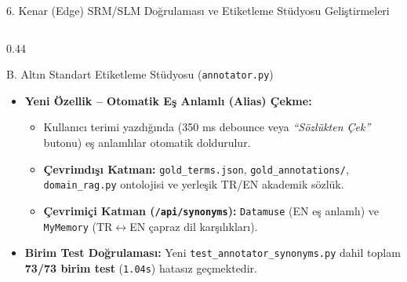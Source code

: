\documentclass[aspectratio=169,10pt]{beamer}
\begin{document}
\begin{frame}{6. Kenar (Edge) SRM/SLM Doğrulaması ve Etiketleme Stüdyosu Geliştirmeleri}
\begin{columns}[T]
\begin{column}{0.44\textwidth}
\begin{block}{B. Altın Standart Etiketleme Stüdyosu (\texttt{annotator.py})}
\begin{itemize}
    \item \textbf{Yeni Özellik -- Otomatik Eş Anlamlı (Alias) Çekme:}
    \begin{itemize}
        \item Kullanıcı terimi yazdığında (350 ms debounce veya \textit{``Sözlükten Çek''} butonu) eş anlamlılar otomatik doldurulur.
        \item \textbf{Çevrimdışı Katman:} \texttt{gold\_terms.json}, \texttt{gold\_annotations/}, \texttt{domain\_rag.py} ontolojisi ve yerleşik TR/EN akademik sözlük.
        \item \textbf{Çevrimiçi Katman (\texttt{/api/synonyms}):} \texttt{Datamuse} (EN eş anlamlı) ve \texttt{MyMemory} (TR$\leftrightarrow$EN çapraz dil karşılıkları).
    \end{itemize}
    \item \textbf{Birim Test Doğrulaması:} Yeni \texttt{test\_annotator\_synonyms.py} dahil toplam \textbf{73/73 birim test} (\texttt{1.04s}) hatasız geçmektedir.
\end{itemize}
\end{block}
\end{column}
\end{columns}
\end{frame}
\end{document}
